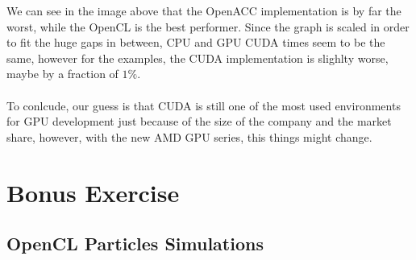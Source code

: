 \documentclass[english]{exam}
\begin{document}
{\begin{center}
  \end{center}
We can see in the image above that the OpenACC implementation is by far the worst, while the OpenCL is the best performer. Since the graph is scaled in order to fit the huge gaps in between, CPU and GPU CUDA times seem to be the same, however for the examples, the CUDA implementation is slighlty worse, maybe by a fraction of $1\%$.
\\\\
To conlcude, our guess is that CUDA is still one of the most used environments for GPU development just because of the size of the company and the market share, however, with the new AMD GPU series, this things might change. 

\clearpage
\chapter{Bonus Exercise}
\section*{OpenCL Particles Simulations}

}
\end{document}
